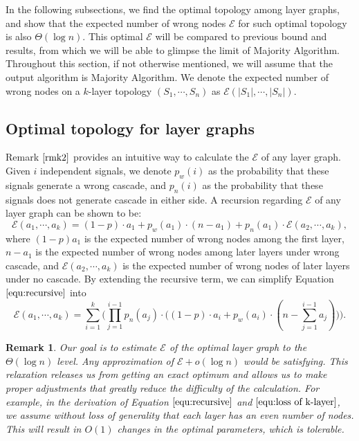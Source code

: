 \documentclass[a4paper,UKenglish]{lipics}
\newtheorem{rmk}{Remark}
\theoremstyle{definition}
\begin{document}
In the following subsections, we find the optimal topology among layer graphs, 
	and show that the expected number of wrong nodes $\mathcal{E}$ for such optimal topology is also $\Theta(\log n)$. 
This optimal $\mathcal{E}$ will be compared to previous bound and results,
	from which we will be able to glimpse the limit of Majority Algorithm. 
Throughout this section, if not otherwise mentioned, we will assume that the output algorithm is Majority Algorithm.
We denote the expected number of wrong nodes on a $k$-layer topology $(S_1, \dotsb, S_n)$ as $\mathcal{E}(|S_1|, \dotsb, |S_n|)$.

\subsection {Optimal topology for layer graphs}

Remark $\ref{rmk2}$ provides an intuitive way to calculate the $\mathcal{E}$ of any layer graph.
Given $i$ independent signals, we denote $p_w(i)$ as the probability that these signals generate a wrong cascade,
	and $p_n(i)$ as the probability that these signals does not generate cascade in either side.
A recursion regarding $\mathcal{E}$ of any layer graph can be shown to be:
\begin{equation}
\label{equ:recursive}
	\mathcal{E}(a_1, \dotsb, a_k)
=
	(1-p)\cdot a_1 + p_w(a_1)\cdot (n - a_1) + p_n(a_1)\cdot \mathcal{E}(a_2, \dotsb, a_k),
\end{equation}
where $(1-p)a_1$ is the expected number of wrong nodes among the first layer, 
	$n-a_1$ is the expected number of wrong nodes among later layers under wrong cascade,
	and $\mathcal{E}(a_2, \dotsb, a_k)$ is the expected number of wrong nodes of later layers under no cascade.
By extending the recursive term, we can simplify Equation $\eqref{equ:recursive}$ into
\begin{equation}
\label{equ:loss of k-layer}
	\mathcal{E}(a_1, \dotsb, a_k)
=
	\sum_{i=1}^{k} \Big(
		\prod_{j=1}^{i-1}p_n(a_j) \cdot \Big(  (1-p)\cdot a_i + p_w(a_i)\cdot (n - \sum_{j=1}^{i-1}a_j) \Big)
	\Big).
\end{equation}
\begin{rmk}
\label{rmk:estimation}
Our goal is to estimate $\mathcal{E}$ of the optimal layer graph
	to the $\Theta(\log n)$ level.
Any approximation of $\mathcal{E} + o(\log n)$ would be satisfying.
This relaxation releases us from getting an exact optimum and allows us to make proper adjustments that greatly reduce the difficulty of the calculation.
For example, in the derivation of Equation $\eqref{equ:recursive}$ and $\eqref{equ:loss of k-layer}$, we assume without loss of generality that each layer has an even number of nodes.
This will result in $O(1)$ changes in the optimal parameters, which is tolerable.
\end{rmk}
\end{document}
